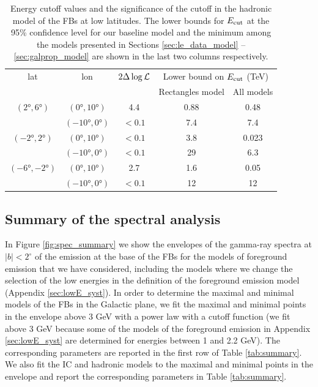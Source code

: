 \begin{table}
  \begin{center}
    \caption{\label{tab:pi0} 
Energy cutoff values and the significance of the cutoff in the hadronic model of the FBs at low latitudes.
The lower bounds for $E_{\text{cut}}$ at the 95\% confidence level for our baseline model and the minimum 
among the models presented in Sections \ref{sec:le_data_model} -- \ref{sec:galprop_model}
 are shown in the last two columns respectively. 
}
    \begin{tabular}{|c|c|c|c|c|} %
     	\hline
		 lat & lon  & $2 \Delta \log {\mathcal{L}}$ & \multicolumn{2}{c|}{Lower bound on $E_{\text{cut}}$ (TeV) } \\
		      &        &                                  &       \multicolumn{1}{c}{Rectangles model} & All models \\ 
		\hline
  		$(\ang{2}, \ang{6})$ & $(\ang{0}, \ang{10})$ & 4.4 & {0.88} & {0.48} \\ 
		& $(\ang{-10}, \ang{0})$ &  $ < 0.1$ & {7.4} & {7.4}\\ 
 		\hline
  		$(\ang{-2}, \ang{2})$ & $(\ang{0}, \ang{10})$ & $ < 0.1$ & {3.8} & 0.023 \\ 
		& $(\ang{-10}, \ang{0})$ & $ < 0.1$ & {29} & 6.3 \\ 
 		\hline
  		$(\ang{-6}, \ang{-2})$ & $(\ang{0}, \ang{10})$ & 2.7 & 1.6 & 0.05 \\ 
		& $(\ang{-10}, \ang{0})$ & $ < 0.1$ & {12} & {12}\\ 
 \hline
    \end{tabular}
  \end{center}
\end{table}

\subsection{Summary of the spectral analysis}

In Figure \ref{fig:spec_summary} we show the envelopes of the gamma-ray spectra at $|b| < 2^\circ$ of the emission at the base of the FBs
for the models of foreground emission that we have considered, including the models where we change the selection of the low energies 
in the definition of the foreground emission model (Appendix \ref{sec:lowE_syst}).
In order to determine the maximal and minimal models of the FBs in the Galactic plane, 
we fit the maximal and minimal points in the envelope above 3 GeV with a power law with a cutoff function
(we fit above 3 GeV because some of the models of the foreground emission in Appendix \ref{sec:lowE_syst} are determined 
for energies between 1 and 2.2 GeV).
The corresponding parameters are reported in the first row of Table \ref{tab:summary}.
We also fit the IC and hadronic models to the maximal and minimal points in the envelope and report the corresponding parameters
in Table \ref{tab:summary}.


